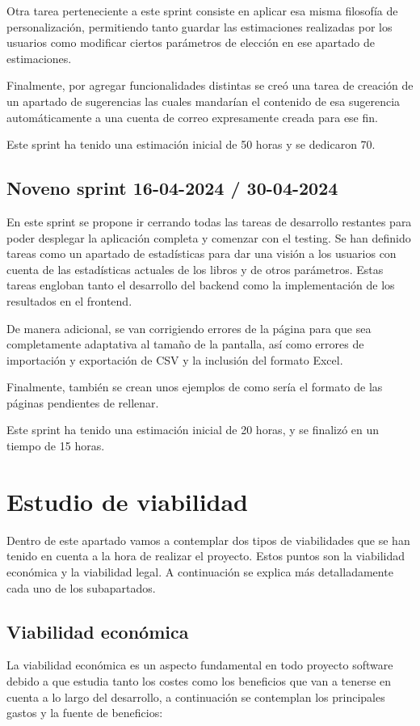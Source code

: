 Otra tarea perteneciente a este sprint consiste en aplicar esa misma filosofía de personalización, permitiendo tanto guardar las estimaciones realizadas por los usuarios como modificar ciertos parámetros de elección en ese apartado de estimaciones.

Finalmente, por agregar funcionalidades distintas se creó una tarea de creación de un apartado de sugerencias las cuales mandarían el contenido de esa sugerencia automáticamente a una cuenta de correo expresamente creada para ese fin.

Este sprint ha tenido una estimación inicial de 50 horas y se dedicaron 70.

\subsection{Noveno sprint 16-04-2024 / 30-04-2024}
En este sprint se propone ir cerrando todas las tareas de desarrollo restantes para poder desplegar la aplicación completa y comenzar con el testing.
Se han definido tareas como un apartado de estadísticas para dar una visión a los usuarios con cuenta de las estadísticas actuales de los libros y de otros parámetros.
Estas tareas engloban tanto el desarrollo del backend como la implementación de los resultados en el frontend.

De manera adicional, se van corrigiendo errores de la página para que sea completamente adaptativa al tamaño de la pantalla, así como errores de importación y exportación de CSV y la inclusión del formato Excel.

Finalmente, también se crean unos ejemplos de como sería el formato de las páginas pendientes de rellenar.

Este sprint ha tenido una estimación inicial de 20 horas, y se finalizó en un tiempo de 15 horas.





\section{Estudio de viabilidad}
Dentro de este apartado vamos a contemplar dos tipos de viabilidades que se han tenido en cuenta a la hora de realizar el proyecto. Estos puntos son la viabilidad económica y la viabilidad legal. A continuación se explica más detalladamente cada uno de los subapartados.

\subsection{Viabilidad económica}
La viabilidad económica es un aspecto fundamental en todo proyecto software debido a que estudia tanto los costes como los beneficios que van a tenerse en cuenta a lo largo del desarrollo, a continuación se contemplan los principales gastos y la fuente de beneficios:

